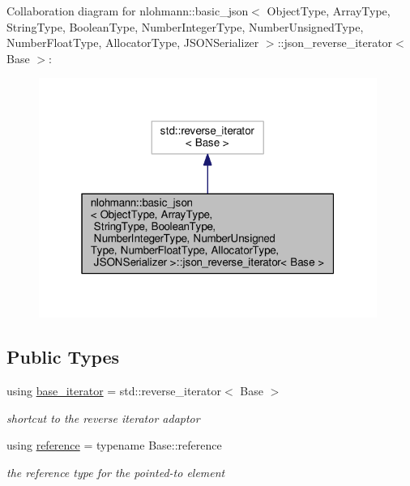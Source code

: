 Collaboration diagram for nlohmann\+:\+:basic\+\_\+json$<$ Object\+Type, Array\+Type, String\+Type, Boolean\+Type, Number\+Integer\+Type, Number\+Unsigned\+Type, Number\+Float\+Type, Allocator\+Type, J\+S\+O\+N\+Serializer $>$\+:\+:json\+\_\+reverse\+\_\+iterator$<$ Base $>$\+:
\nopagebreak
\begin{figure}[H]
\begin{center}
\leavevmode
\includegraphics[width=313pt]{classnlohmann_1_1basic__json_1_1json__reverse__iterator__coll__graph}
\end{center}
\end{figure}
\subsection*{Public Types}
\begin{DoxyCompactItemize}
\item 
using \hyperlink{classnlohmann_1_1basic__json_1_1json__reverse__iterator_a5b7f3c5d86fe89a65d9552c1cac37261}{base\+\_\+iterator} = std\+::reverse\+\_\+iterator$<$ Base $>$\hypertarget{classnlohmann_1_1basic__json_1_1json__reverse__iterator_a5b7f3c5d86fe89a65d9552c1cac37261}{}\label{classnlohmann_1_1basic__json_1_1json__reverse__iterator_a5b7f3c5d86fe89a65d9552c1cac37261}

\begin{DoxyCompactList}\small\item\em shortcut to the reverse iterator adaptor \end{DoxyCompactList}\item 
using \hyperlink{classnlohmann_1_1basic__json_1_1json__reverse__iterator_ab0021ef2007fd338615360af404dcd4e}{reference} = typename Base\+::reference\hypertarget{classnlohmann_1_1basic__json_1_1json__reverse__iterator_ab0021ef2007fd338615360af404dcd4e}{}\label{classnlohmann_1_1basic__json_1_1json__reverse__iterator_ab0021ef2007fd338615360af404dcd4e}

\begin{DoxyCompactList}\small\item\em the reference type for the pointed-\/to element \end{DoxyCompactList}\end{DoxyCompactItemize}
